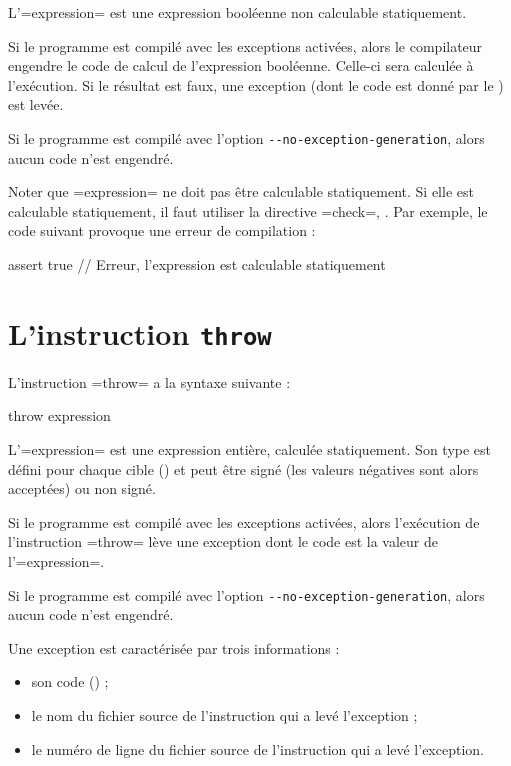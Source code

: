 L'\plm=expression= est une expression booléenne non calculable statiquement.

Si le programme est compilé avec les exceptions activées, alors le compilateur engendre le code de calcul de l'expression booléenne. Celle-ci sera calculée à l'exécution. Si le résultat est faux, une exception (dont le code est donné par le ) est levée.

Si le programme est compilé avec l'option \texttt{-{}-no-exception-generation}, alors aucun code n'est engendré.

Noter que \plm=expression= ne doit pas être calculable statiquement. Si elle est calculable statiquement, il faut utiliser la directive \plm=check=, . Par exemple, le code suivant provoque une erreur de compilation :
\begin{PLM}
assert true // Erreur, l'expression est calculable statiquement
\end{PLM}



\section{L'instruction \texttt{throw}}

L'instruction \plm=throw= a la syntaxe suivante :
\begin{PLM}
throw expression
\end{PLM}

L'\plm=expression= est une expression entière, calculée statiquement. Son type est défini pour chaque cible () et peut être signé (les valeurs négatives sont alors acceptées) ou non signé.

Si le programme est compilé avec les exceptions activées, alors l'exécution de l'instruction \plm=throw= lève une exception dont le code est la valeur de l'\plm=expression=.

Si le programme est compilé avec l'option \texttt{-{}-no-exception-generation}, alors aucun code n'est engendré.





Une exception est caractérisée par trois informations :
\begin{itemize}
  \item son code () ;
  \item le nom du fichier source de l'instruction qui a levé l'exception ;
  \item le numéro de ligne du fichier source de l'instruction qui a levé l'exception.
\end{itemize}

